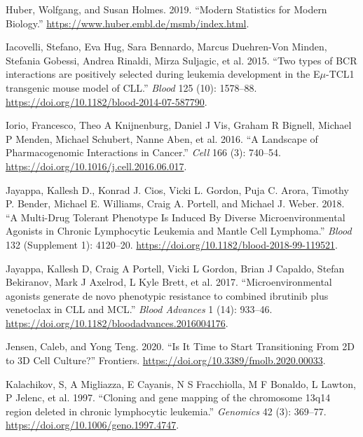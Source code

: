 \documentclass[11pt, a4paper, twosided]{book}
\newenvironment{CSLReferences}%
  {}%
  {\par}
\begin{document}
\begin{CSLReferences}{1}{0}
\leavevmode{}%
Huber, Wolfgang, and Susan Holmes. 2019. {``{Modern Statistics for Modern Biology}.''} \url{https://www.huber.embl.de/msmb/index.html}.

\leavevmode{}%
Iacovelli, Stefano, Eva Hug, Sara Bennardo, Marcus Duehren-Von Minden, Stefania Gobessi, Andrea Rinaldi, Mirza Suljagic, et al. 2015. {``{Two types of BCR interactions are positively selected during leukemia development in the E\(\mu\)-TCL1 transgenic mouse model of CLL}.''} \emph{Blood} 125 (10): 1578--88. \url{https://doi.org/10.1182/blood-2014-07-587790}.

\leavevmode{}%
Iorio, Francesco, Theo A Knijnenburg, Daniel J Vis, Graham R Bignell, Michael P Menden, Michael Schubert, Nanne Aben, et al. 2016. {``{A Landscape of Pharmacogenomic Interactions in Cancer}.''} \emph{Cell} 166 (3): 740--54. \url{https://doi.org/10.1016/j.cell.2016.06.017}.

\leavevmode{}%
Jayappa, Kallesh D., Konrad J. Cios, Vicki L. Gordon, Puja C. Arora, Timothy P. Bender, Michael E. Williams, Craig A. Portell, and Michael J. Weber. 2018. {``{A Multi-Drug Tolerant Phenotype Is Induced By Diverse Microenvironmental Agonists in Chronic Lymphocytic Leukemia and Mantle Cell Lymphoma}.''} \emph{Blood} 132 (Supplement 1): 4120--20. \url{https://doi.org/10.1182/blood-2018-99-119521}.

\leavevmode{}%
Jayappa, Kallesh D, Craig A Portell, Vicki L Gordon, Brian J Capaldo, Stefan Bekiranov, Mark J Axelrod, L Kyle Brett, et al. 2017. {``{Microenvironmental agonists generate de novo phenotypic resistance to combined ibrutinib plus venetoclax in CLL and MCL}.''} \emph{Blood Advances} 1 (14): 933--46. \url{https://doi.org/10.1182/bloodadvances.2016004176}.

\leavevmode{}%
Jensen, Caleb, and Yong Teng. 2020. {``{Is It Time to Start Transitioning From 2D to 3D Cell Culture?}''} Frontiers. \url{https://doi.org/10.3389/fmolb.2020.00033}.

\leavevmode{}%
Kalachikov, S, A Migliazza, E Cayanis, N S Fracchiolla, M F Bonaldo, L Lawton, P Jelenc, et al. 1997. {``{Cloning and gene mapping of the chromosome 13q14 region deleted in chronic lymphocytic leukemia}.''} \emph{Genomics} 42 (3): 369--77. \url{https://doi.org/10.1006/geno.1997.4747}.


\end{CSLReferences}
\end{document}
